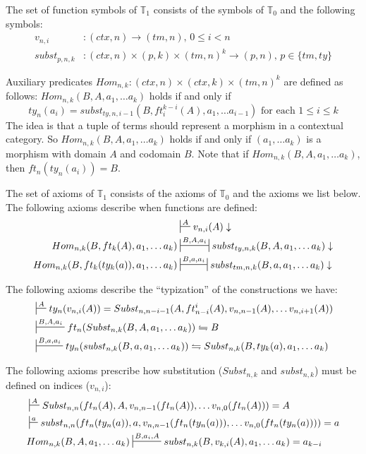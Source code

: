 \documentclass[reqno]{amsart}
\theoremstyle{definition}
\theoremstyle{remark}
\numberwithin{figure}{section}
\begin{document}
The set of function symbols of $\mathbb{T}_1$ consists of the symbols of $\mathbb{T}_0$ and the following symbols:
\begin{align*}
v_{n,i}       & : (ctx,n) \to (tm,n) \text{, } 0 \leq i < n \\
subst_{p,n,k} & : (ctx,n) \times (p,k) \times (tm,n)^k \to (p,n) \text{, } p \in \{ tm, ty \}
\end{align*}

Auxiliary predicates $Hom_{n,k} : (ctx,n) \times (ctx,k) \times (tm,n)^k$ are defined as follows: $Hom_{n,k}(B, A, a_1, \ldots a_k)$ holds if and only if
\[ ty_n(a_i) = subst_{ty,n,i-1}(B, ft^{k-i}_i(A), a_1, \ldots a_{i-1}) \text{ for each } 1 \leq i \leq k \]
The idea is that a tuple of terms should represent a morphism in a contextual category.
So $Hom_{n,k}(B, A, a_1, \ldots a_k)$ holds if and only if $(a_1, \ldots a_k)$ is a morphism with domain $A$ and codomain $B$.
Note that if $Hom_{n,k}(B, A, a_1, \ldots a_k)$, then $ft_n(ty_n(a_i)) = B$.

The set of axioms of $\mathbb{T}_1$ consists of the axioms of $\mathbb{T}_0$ and the axioms we list below.
The following axioms describe when functions are defined:
\begin{align}
\label{ax:def-var}
                                             & \sststile{}{A}           v_{n,i}(A) \downarrow \\
\label{ax:def-Subst}
Hom_{n,k}(B, ft_k(A), a_1, \ldots a_k)       & \ssststile{}{B, A, a_i}  subst_{ty,n,k}(B, A, a_1, \ldots a_k) \downarrow \\
\label{ax:def-subst}
Hom_{n,k}(B, ft_k(ty_k(a)), a_1, \ldots a_k) & \ssststile{}{B, a, a_i}  subst_{tm,n,k}(B, a, a_1, \ldots a_k) \downarrow
\end{align}

The following axioms describe the ``typization'' of the constructions we have:
\begin{align}
\label{ax:type-var}
& \sststile{}{A}         ty_n(v_{n,i}(A)) = Subst_{n,n-i-1}(A, ft^i_{n-i}(A), v_{n,n-1}(A), \ldots v_{n,i+1}(A)) \\
\label{ax:type-Subst}
& \sststile{}{B, A, a_i} ft_n(Subst_{n,k}(B, A, a_1, \ldots a_k)) \leftrightharpoons B \\
\label{ax:type-subst}
& \sststile{}{B, a, a_i} ty_n(subst_{n,k}(B, a, a_1, \ldots a_k)) \leftrightharpoons Subst_{n,k}(B, ty_k(a), a_1, \ldots a_k)
\end{align}

The following axioms prescribe how substitution ($Subst_{n,k}$ and $subst_{n,k}$) must be defined on indices ($v_{n,i}$):
\begin{align}
\label{ax:Subst-var}
& \sststile{}{A}         Subst_{n,n}(ft_n(A), A, v_{n,n-1}(ft_n(A)), \ldots v_{n,0}(ft_n(A))) = A \\
\label{ax:subst-var}
& \sststile{}{a}         subst_{n,n}(ft_n(ty_n(a)), a, v_{n,n-1}(ft_n(ty_n(a))), \ldots v_{n,0}(ft_n(ty_n(a)))) = a \\
\label{ax:var-subst}
& Hom_{n,k}(B, A, a_1, \ldots a_k) \sststile{}{B, a_i, A} subst_{n,k}(B, v_{k,i}(A), a_1, \ldots a_k) = a_{k-i}
\end{align}
\end{document}
